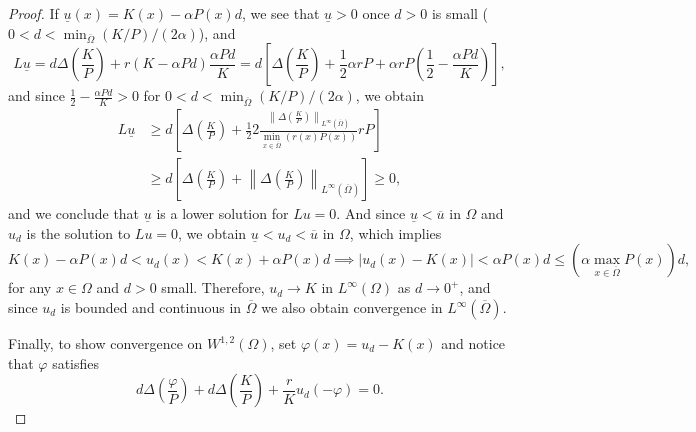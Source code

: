\documentclass[11pt]{article}
\newcommand{\norm}[1]{\left\|#1\right\|}
\newcommand{\parentheses}[1]{\left(#1\right)}
\newcommand{\brackets}[1]{\left[#1\right]}
\theoremstyle{definition}
\theoremstyle{remark}
\begin{document}
\begin{proof}
    If $\underline{u}(x)=K(x)-\alpha P(x)d$, we see that $\underline{u}>0$ once $d>0$ is small ($0<d< \min_{\overline{\Omega}}(K/P)/(2\alpha)$), and
    \begin{equation*}
        L\underline{u}=d\Delta\parentheses{\frac{K}{P}}+r(K-\alpha Pd)\frac{\alpha Pd}{K}=d\brackets{\Delta\parentheses{\frac{K}{P}}+\frac{1}{2}\alpha rP+\alpha rP\parentheses{\frac{1}{2}-\frac{\alpha Pd}{K}}},
    \end{equation*}
    and since $\frac{1}{2}-\frac{\alpha Pd}{K}>0$ for $0<d< \min_{\overline{\Omega}}(K/P)/(2\alpha)$, we obtain
     \begin{align*}
      L\underline{u} & \geq d\brackets{\Delta\parentheses{\frac{K}{P}}+\frac{1}{2}2\frac{\norm{\Delta(\frac{K}{P})}_{L^\infty(\overline{\Omega})}}{\min_{x\in\overline{\Omega}}(r(x)P(x))}rP}
\\ & \geq d\brackets{\Delta\parentheses{\frac{K}{P}}+\norm{\Delta \left( \frac{K}{P} \right)}_{L^\infty(\overline{\Omega} )}}\geq 0,
    \end{align*}
    and we conclude that  $\underline{u}$ is a lower solution for $Lu=0$. And since $\underline{u}<\overline{u}$ in $\Omega$ and $u_d$ is the solution to $Lu=0$, we obtain $\underline{u}<u_d<\overline{u}$ in $\Omega$, which implies
    \begin{equation*}
        K(x)-\alpha P(x)d<u_d(x)<K(x)+\alpha P(x)d \implies |u_d(x)-K(x)|<\alpha P(x)d\leq\parentheses{\alpha \max_{x\in\overline{\Omega}}P(x)}d,
    \end{equation*}
    for any $x\in\Omega$ and $d>0$ small. Therefore, $u_d\to K$ in $L^\infty(\Omega)$ as $d\to 0^+$, and since $u_d$ is bounded and continuous in $\overline{\Omega}$ we also obtain convergence in $L^\infty(\overline{\Omega})$.

    Finally, to show convergence on $W^{1,2}(\Omega)$, set $\varphi(x)=u_d-K(x)$ and notice that $\varphi$ satisfies
    \begin{equation}\label{Eq.1 Feb25th}
        d\Delta\parentheses{\frac{\varphi}{P}}+d\Delta\parentheses{\frac{K}{P}}+\frac{r}{K} u_d(-\varphi)=0.
    \end{equation}


\end{proof}
\end{document}
